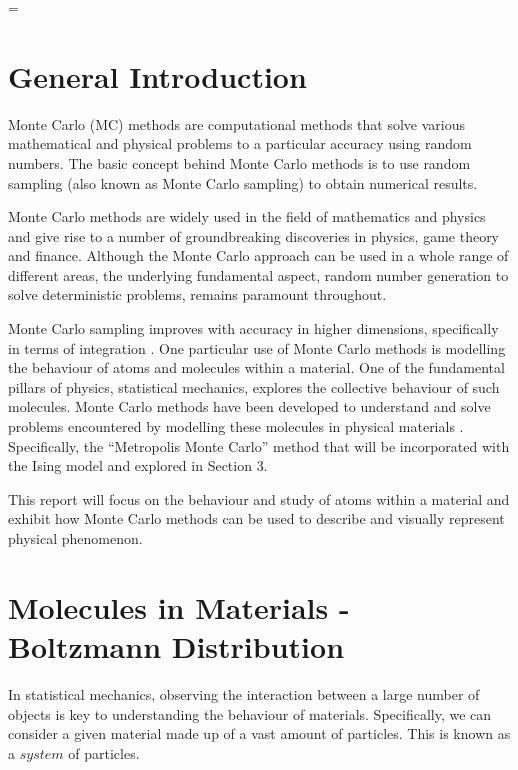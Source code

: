 \documentclass[a4paper]{article}
\begin{document}
\newpage
\parskip = \baselineskip
\section{General Introduction}


Monte Carlo (MC) methods are computational methods that solve various mathematical and physical problems to a particular accuracy using random numbers. The basic concept behind Monte Carlo methods is to use random sampling (also known as Monte Carlo sampling) to obtain numerical results.

Monte Carlo methods are widely used in the field of mathematics and physics and give rise to a number of groundbreaking discoveries in physics, game theory and finance. Although the Monte Carlo approach can be used in a whole range of different areas, the underlying fundamental aspect, random number generation to solve deterministic problems, remains paramount throughout. 

Monte Carlo sampling improves with accuracy in higher dimensions, specifically in terms of integration \cite{1}. One particular use of Monte Carlo methods is modelling the behaviour of atoms and molecules within a material. One of the fundamental pillars of physics, statistical mechanics, explores the collective behaviour of such molecules. Monte Carlo methods have been developed to understand and solve problems encountered by modelling these molecules in physical materials \cite{2}. Specifically, the “Metropolis Monte Carlo” method that will be incorporated with the Ising model and explored in Section 3.

This report will focus on the behaviour and study of atoms within a material and exhibit how Monte Carlo methods can be used to describe and visually represent physical phenomenon.

\section{Molecules in Materials - Boltzmann Distribution}

In statistical mechanics, observing the interaction between a large number of objects is key to understanding the behaviour of materials. Specifically, we can consider a given material made up of a vast amount of particles. This is known as a $system$ of particles. 
\end{document}
